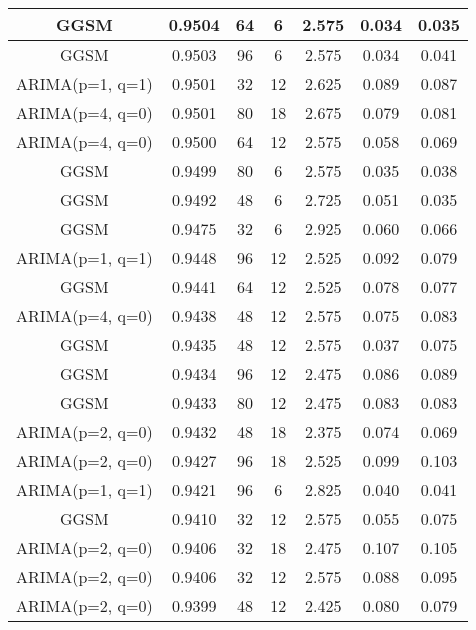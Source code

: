 \begin{table*}[h!]
\begin{tabular}{|c|c|c|c|c|c|c|}
        \hline
        GGSM & 0.9504 & 64 & 6 & 2.575 &  0.034 & 0.035 \\
        \hline
        GGSM & 0.9503 & 96 & 6 & 2.575 &  0.034 & 0.041 \\
        \hline
        ARIMA(p=1, q=1) & 0.9501 & 32 & 12 & 2.625 &  0.089 & 0.087 \\
        \hline
        ARIMA(p=4, q=0) & 0.9501 & 80 & 18 & 2.675 &  0.079 & 0.081 \\
        \hline
        ARIMA(p=4, q=0) & 0.9500 & 64 & 12 & 2.575 &  0.058 & 0.069 \\
        \hline
        GGSM & 0.9499 & 80 & 6 & 2.575 &  0.035 & 0.038 \\
        \hline
        GGSM & 0.9492 & 48 & 6 & 2.725 &  0.051 & 0.035 \\
        \hline
        GGSM & 0.9475 & 32 & 6 & 2.925 &  0.060 & 0.066 \\
        \hline
        ARIMA(p=1, q=1) & 0.9448 & 96 & 12 & 2.525 &  0.092 & 0.079 \\
        \hline
        GGSM & 0.9441 & 64 & 12 & 2.525 &  0.078 & 0.077 \\
        \hline
        ARIMA(p=4, q=0) & 0.9438 & 48 & 12 & 2.575 &  0.075 & 0.083 \\
        \hline
        GGSM & 0.9435 & 48 & 12 & 2.575 &  0.037 & 0.075 \\
        \hline
        GGSM & 0.9434 & 96 & 12 & 2.475 &  0.086 & 0.089 \\
        \hline
        GGSM & 0.9433 & 80 & 12 & 2.475 &  0.083 & 0.083 \\
        \hline
        ARIMA(p=2, q=0) & 0.9432 & 48 & 18 & 2.375 &  0.074 & 0.069 \\
        \hline
        ARIMA(p=2, q=0) & 0.9427 & 96 & 18 & 2.525 &  0.099 & 0.103 \\
        \hline
        ARIMA(p=1, q=1) & 0.9421 & 96 & 6 & 2.825 &  0.040 & 0.041 \\
        \hline
        GGSM & 0.9410 & 32 & 12 & 2.575 &  0.055 & 0.075 \\
        \hline
        ARIMA(p=2, q=0) & 0.9406 & 32 & 18 & 2.475 &  0.107 & 0.105 \\
        \hline
        ARIMA(p=2, q=0) & 0.9406 & 32 & 12 & 2.575 &  0.088 & 0.095 \\
        \hline
        ARIMA(p=2, q=0) & 0.9399 & 48 & 12 & 2.425 &  0.080 & 0.079 \\
        \hline
    \end{tabular}
\end{table*}
